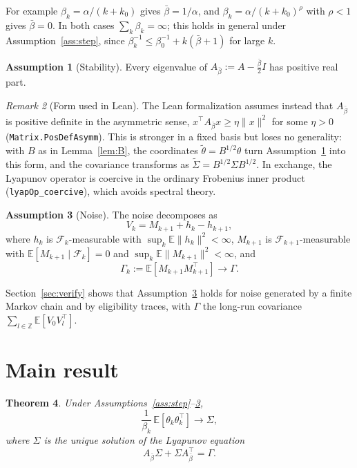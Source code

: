 \documentclass[11pt]{article}
\newtheorem{theorem}{Theorem}[section]
\theoremstyle{definition}
\newtheorem{assumption}[theorem]{Assumption}
\theoremstyle{remark}
\newtheorem{remark}[theorem]{Remark}
\newcommand{\E}{\mathbb{E}}
\newcommand{\F}{\mathcal{F}}
\begin{document}
For example $\beta_k = \alpha/(k + k_0)$ gives $\bar\beta = 1/\alpha$, and
$\beta_k = \alpha/(k+k_0)^\rho$ with $\rho < 1$ gives $\bar\beta = 0$. In both cases
$\sum_k\beta_k = \infty$; this holds in general under Assumption~\ref{ass:step}, since
$\beta_k^{-1} \le \beta_0^{-1} + k(\bar\beta + 1)$ for large $k$.

\begin{assumption}[Stability]\label{ass:stable}
Every eigenvalue of $A_{\bar\beta} := A - \tfrac{\bar\beta}{2}I$ has positive real part.
\end{assumption}

\begin{remark}[Form used in Lean]\label{rem:posdef}
The Lean formalization assumes instead that $A_{\bar\beta}$ is positive definite in the
asymmetric sense, $x^\top A_{\bar\beta}x \ge \eta\|x\|^2$ for some $\eta > 0$
(\texttt{Matrix.PosDefAsymm}). This is stronger in a fixed basis but loses no generality:
with $B$ as in Lemma~\ref{lem:B}, the coordinates $\tilde\theta = B^{1/2}\theta$ turn
Assumption~\ref{ass:stable} into this form, and the covariance transforms as
$\tilde\Sigma = B^{1/2}\Sigma B^{1/2}$. In exchange, the Lyapunov operator is coercive in the
ordinary Frobenius inner product (\texttt{lyapOp\_coercive}), which avoids spectral theory.
\end{remark}

\begin{assumption}[Noise]\label{ass:noise}
The noise decomposes as
\[
  V_k = M_{k+1} + h_k - h_{k+1},
\]
where $h_k$ is $\F_k$-measurable with $\sup_k\E\|h_k\|^2 < \infty$, $M_{k+1}$ is
$\F_{k+1}$-measurable with $\E[M_{k+1}\mid\F_k] = 0$ and $\sup_k\E\|M_{k+1}\|^2 < \infty$,
and
\[
  \Gamma_k := \E[M_{k+1}M_{k+1}^\top] \longrightarrow \Gamma .
\]
\end{assumption}

Section~\ref{sec:verify} shows that Assumption~\ref{ass:noise} holds for noise
generated by a finite Markov chain and by eligibility traces, with $\Gamma$ the
long-run covariance $\sum_{l\in\mathbb Z}\E[V_0V_l^\top]$.

\section{Main result}

\begin{theorem}\label{thm:main}
Under Assumptions~\ref{ass:step}--\ref{ass:noise},
\[
  \frac{1}{\beta_k}\,\E[\theta_k\theta_k^\top] \longrightarrow \Sigma,
\]
where $\Sigma$ is the unique solution of the Lyapunov equation
\begin{equation}\label{eq:lyap}
  A_{\bar\beta}\Sigma + \Sigma A_{\bar\beta}^\top = \Gamma .
\end{equation}
\end{theorem}
\end{document}
